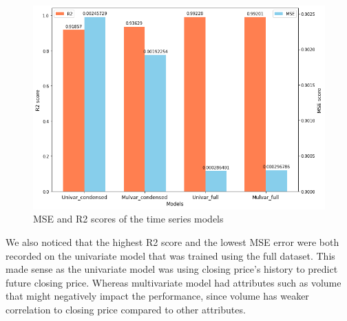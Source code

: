 \documentclass{article}
\begin{document}
\begin{figure}[H]
	\begin{center}
		\includegraphics[scale=0.45]{p11.png}\caption{MSE and R2 scores of the time series models}
	\end{center}
\end{figure}

We also noticed that the highest R2 score and the lowest MSE error were both recorded on the univariate model that was trained using the full dataset. This made sense as the univariate model was using closing price's history to predict future closing price. Whereas multivariate model had attributes such as volume that might negatively impact the performance, since volume has weaker correlation to closing price compared to other attributes.  
\end{document}
